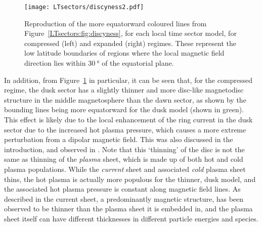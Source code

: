 \begin{figure}
\centering
\texttt{[image: LTsectors/discyness2.pdf]}
\caption[Reproduction of the lower latitude bounding lines from Figure~\ref{LTsectors:fig:discyness}.]{Reproduction of the more equatorward coloured lines from Figure~\ref{LTsectors:fig:discyness}, for each local time sector model, for compressed (left) and expanded (right) regimes. These represent the low latitude boundaries of regions where the local magnetic field direction lies within $\SI{30}{\degree}$ of the equatorial plane.}
\label{LTsectors:fig:discyness2}
\end{figure}

In addition, from Figure~\ref{LTsectors:fig:discyness2} in particular, it can be seen that, for the compressed regime, the dusk sector has a slightly thinner and more disc-like magnetodisc structure in the middle magnetosphere than the dawn sector, as shown by the bounding lines being more equatorward for the dusk model (shown in green). This effect is likely due to the local enhancement of the ring current in the dusk sector due to the increased hot plasma pressure, which causes a more extreme perturbation from a dipolar magnetic field. This was also discussed in the introduction, and observed in \citet{achilleos2010b,sorba2017}. Note that this `thinning' of the disc is not the same as thinning of the \textit{plasma} sheet, which is made up of both hot and cold plasma populations. While the \textit{current} sheet and associated \textit{cold} plasma sheet thins, the hot plasma is actually more populous for the thinner, dusk model, and the associated hot plasma pressure is constant along magnetic field lines. As described in \citet{sergis2011,arridge2009b} the current sheet, a predominantly magnetic structure, has been observed to be thinner than the plasma sheet it is embedded in, and the plasma sheet itself can have different thicknesses in different particle energies and species.

